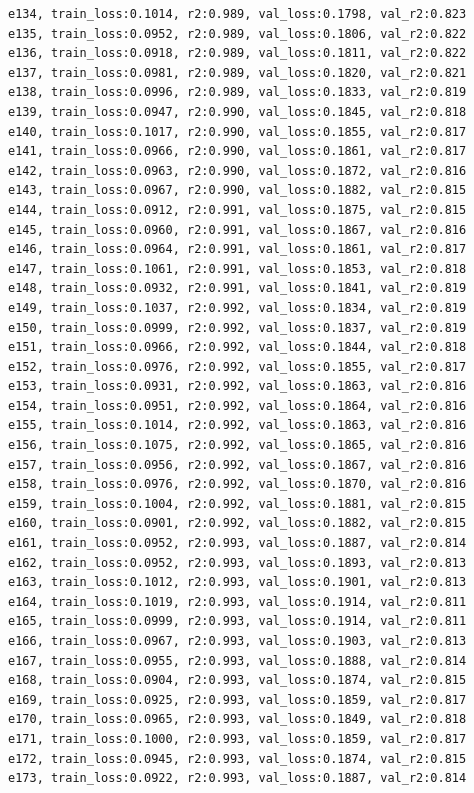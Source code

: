 \documentclass[a4paper, 12pt]{article}
\begin{document}
\begin{lstlisting}
e134, train_loss:0.1014, r2:0.989, val_loss:0.1798, val_r2:0.823
e135, train_loss:0.0952, r2:0.989, val_loss:0.1806, val_r2:0.822
e136, train_loss:0.0918, r2:0.989, val_loss:0.1811, val_r2:0.822
e137, train_loss:0.0981, r2:0.989, val_loss:0.1820, val_r2:0.821
e138, train_loss:0.0996, r2:0.989, val_loss:0.1833, val_r2:0.819
e139, train_loss:0.0947, r2:0.990, val_loss:0.1845, val_r2:0.818
e140, train_loss:0.1017, r2:0.990, val_loss:0.1855, val_r2:0.817
e141, train_loss:0.0966, r2:0.990, val_loss:0.1861, val_r2:0.817
e142, train_loss:0.0963, r2:0.990, val_loss:0.1872, val_r2:0.816
e143, train_loss:0.0967, r2:0.990, val_loss:0.1882, val_r2:0.815
e144, train_loss:0.0912, r2:0.991, val_loss:0.1875, val_r2:0.815
e145, train_loss:0.0960, r2:0.991, val_loss:0.1867, val_r2:0.816
e146, train_loss:0.0964, r2:0.991, val_loss:0.1861, val_r2:0.817
e147, train_loss:0.1061, r2:0.991, val_loss:0.1853, val_r2:0.818
e148, train_loss:0.0932, r2:0.991, val_loss:0.1841, val_r2:0.819
e149, train_loss:0.1037, r2:0.992, val_loss:0.1834, val_r2:0.819
e150, train_loss:0.0999, r2:0.992, val_loss:0.1837, val_r2:0.819
e151, train_loss:0.0966, r2:0.992, val_loss:0.1844, val_r2:0.818
e152, train_loss:0.0976, r2:0.992, val_loss:0.1855, val_r2:0.817
e153, train_loss:0.0931, r2:0.992, val_loss:0.1863, val_r2:0.816
e154, train_loss:0.0951, r2:0.992, val_loss:0.1864, val_r2:0.816
e155, train_loss:0.1014, r2:0.992, val_loss:0.1863, val_r2:0.816
e156, train_loss:0.1075, r2:0.992, val_loss:0.1865, val_r2:0.816
e157, train_loss:0.0956, r2:0.992, val_loss:0.1867, val_r2:0.816
e158, train_loss:0.0976, r2:0.992, val_loss:0.1870, val_r2:0.816
e159, train_loss:0.1004, r2:0.992, val_loss:0.1881, val_r2:0.815
e160, train_loss:0.0901, r2:0.992, val_loss:0.1882, val_r2:0.815
e161, train_loss:0.0952, r2:0.993, val_loss:0.1887, val_r2:0.814
e162, train_loss:0.0952, r2:0.993, val_loss:0.1893, val_r2:0.813
e163, train_loss:0.1012, r2:0.993, val_loss:0.1901, val_r2:0.813
e164, train_loss:0.1019, r2:0.993, val_loss:0.1914, val_r2:0.811
e165, train_loss:0.0999, r2:0.993, val_loss:0.1914, val_r2:0.811
e166, train_loss:0.0967, r2:0.993, val_loss:0.1903, val_r2:0.813
e167, train_loss:0.0955, r2:0.993, val_loss:0.1888, val_r2:0.814
e168, train_loss:0.0904, r2:0.993, val_loss:0.1874, val_r2:0.815
e169, train_loss:0.0925, r2:0.993, val_loss:0.1859, val_r2:0.817
e170, train_loss:0.0965, r2:0.993, val_loss:0.1849, val_r2:0.818
e171, train_loss:0.1000, r2:0.993, val_loss:0.1859, val_r2:0.817
e172, train_loss:0.0945, r2:0.993, val_loss:0.1874, val_r2:0.815
e173, train_loss:0.0922, r2:0.993, val_loss:0.1887, val_r2:0.814

\end{lstlisting}
\end{document}

